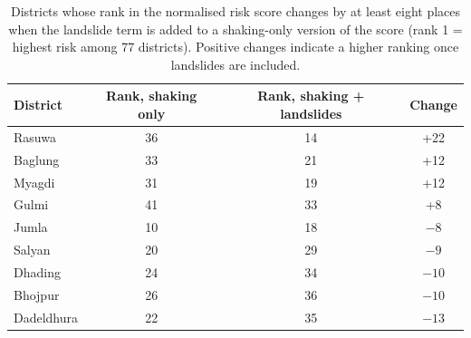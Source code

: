 \documentclass[preprint,12pt,authoryear]{elsarticle}
\begin{document}
\begin{table}[H]
    \centering
    \caption{Districts whose rank in the normalised risk score changes by at least eight places when the landslide term is added to a shaking-only version of the score (rank 1 = highest risk among 77 districts). Positive changes indicate a higher ranking once landslides are included.}
    \label{tab:S2}
    \begin{tabular}{lccc}
        \toprule
        District & Rank, shaking only & Rank, shaking + landslides & Change \\
        \midrule
        Rasuwa & 36 & 14 & +22 \\
        Baglung & 33 & 21 & +12 \\
        Myagdi & 31 & 19 & +12 \\
        Gulmi & 41 & 33 & +8 \\
        Jumla & 10 & 18 & $-8$ \\
        Salyan & 20 & 29 & $-9$ \\
        Dhading & 24 & 34 & $-10$ \\
        Bhojpur & 26 & 36 & $-10$ \\
        Dadeldhura & 22 & 35 & $-13$ \\
        \bottomrule
    \end{tabular}
\end{table}
\end{document}
